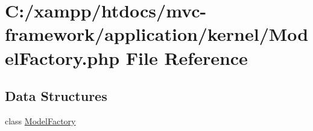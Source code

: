 \hypertarget{_model_factory_8php}{}\section{C\+:/xampp/htdocs/mvc-\/framework/application/kernel/\+Model\+Factory.php File Reference}
\label{_model_factory_8php}
\subsection*{Data Structures}
\begin{DoxyCompactItemize}
\item 
class \hyperlink{class_model_factory}{Model\+Factory}
\end{DoxyCompactItemize}
